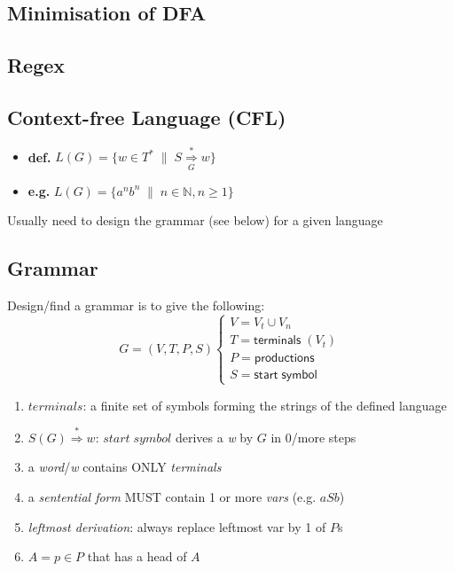 \documentclass[10pt,a4paper,landscape]{article}
\newcommand{\derive}[2]{\overset{#1}{\underset{#2}{\Rightarrow}}}
\begin{document}
\begin{multicols*}{3}
{\begin{minipage}{0.45\linewidth}
\end{minipage}
}


\subsection*{Minimisation of DFA}

\subsection*{Regex}

\subsection*{Context-free Language (CFL)}
\begin{itemize}
\item \textbf{def.} \(L(G) = \{w \in T^{*} \;\|\; S \derive{*}{G} w\}\)
\item \textbf{e.g.} \(L(G) = \{a^{n}b^{n} \;\|\; n \in \mathbb{N}, n \geq 1\}\)
\end{itemize}
Usually need to design the grammar (see below) for a given language

\subsection*{Grammar}
Design/find a grammar is to give the following:
\[
G = (V,T,P,S)\left\{
    \begin{array}{l}
      V = V_{t} \cup V_{n} \\
      T = \mathsf{terminals}\; (V_{t}) \\
      P = \mathsf{productions} \\
      S = \mathsf{start \; symbol}
    \end{array}
    \right.
\]
\begin{enumerate}
\item \(terminals\): a finite set of symbols forming the strings of the defined language
\item \(S(G) \overset{*}{\Rightarrow} w\): \(start\; symbol\) derives a \emph{w} by \(G\) in 0/more steps
\item a \emph{word}/\emph{w} contains ONLY \emph{terminals}
\item a \emph{sentential form} MUST contain 1 or more \emph{vars} (e.g. \(aSb\))
\item \emph{leftmost derivation}: always replace leftmost var by 1 of \(P\)s
\item \(A = p \in P\) that has a head of \(A\)
\end{enumerate}


\end{multicols*}
\end{document}
